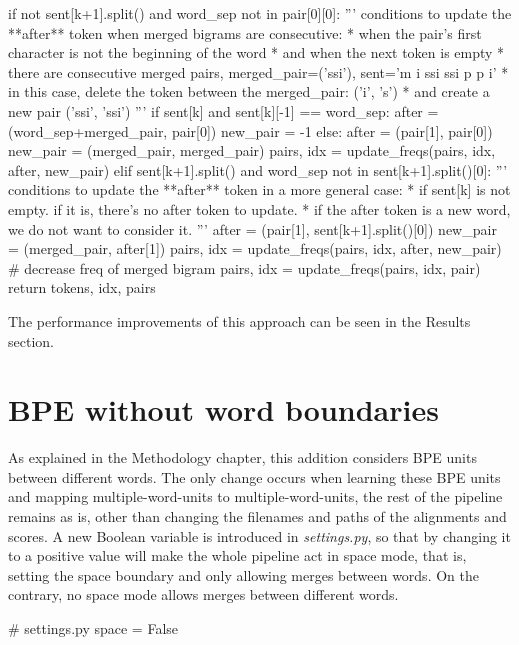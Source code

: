\begin{python}
      if not sent[k+1].split() and word_sep not in pair[0][0]:
        '''
        conditions to update the **after** token when merged bigrams are consecutive:
        * when the pair's first character is not the beginning of the word
        * and when the next token is empty
        * there are consecutive merged pairs, merged_pair=('ssi'), sent='m i ssi ssi p p i'
            * in this case, delete the token between the merged_pair: ('i', 's')
            * and create a new pair ('ssi', 'ssi')
        '''
        if sent[k] and sent[k][-1] == word_sep:
          after = (word_sep+merged_pair, pair[0])
          new_pair = -1
        else:
          after = (pair[1], pair[0])
          new_pair = (merged_pair, merged_pair)
          pairs, idx = update_freqs(pairs, idx, after, new_pair)
      elif sent[k+1].split() and word_sep not in sent[k+1].split()[0]:
        '''
        conditions to update the **after** token in a more general case:
        * if sent[k] is not empty. if it is, there's no after token to update.
        * if the after token is a new word, we do not want to consider it.
        '''
        after = (pair[1], sent[k+1].split()[0])
        new_pair = (merged_pair, after[1])
        pairs, idx = update_freqs(pairs, idx, after, new_pair)
      # decrease freq of merged bigram
      pairs, idx = update_freqs(pairs, idx, pair)
  return tokens, idx, pairs
\end{python}

The performance improvements of this approach can be seen in the Results section.

\section{BPE without word boundaries}

As explained in the Methodology chapter, this addition considers BPE units between different words. The only change occurs when learning these BPE units and mapping multiple-word-units to multiple-word-units, the rest of the pipeline remains as is, other than changing the filenames and paths of the alignments and scores. A new Boolean variable is introduced in \emph{settings.py}, so that by changing it to a positive value will make the whole pipeline act in space mode, that is, setting the space boundary and only allowing merges between words. On the contrary, no space mode allows merges between different words.

\begin{python}
# settings.py
space = False
\end{python}


